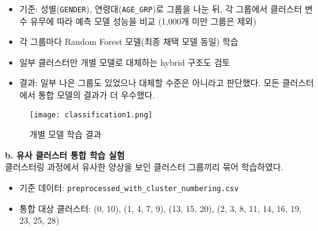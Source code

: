 \documentclass[sigconf]{acmart}
\begin{document}
\begin{CJK}{UTF8}{mj}
\begin{itemize}
  \item 기준: 성별(\texttt{GENDER}), 연령대(\texttt{AGE\_GRP})로 그룹을 나눈 뒤, 각 그룹에서 클러스터 변수 유무에 따라 예측 모델 성능을 비교 (1,000개 미만 그룹은 제외)
  \item 각 그룹마다 Random Forest 모델(최종 채택 모델 동일) 학습
  \item 일부 클러스터만 개별 모델로 대체하는 hybrid 구조도 검토
  \item 결과: 일부 나은 그룹도 있었으나 대체할 수준은 아니라고 판단했다. 모든 클러스터에서 통합 모델의 결과가 더 우수했다.
\end{itemize}
      \begin{figure}[H]
      \centering
      \texttt{[image: classification1.png]}
      \caption{개별 모델 학습 결과}
      \label{fig:based_on_cluster}
      \end{figure}

\vspace{0.5em}
\noindent\textbf{b. 유사 클러스터 통합 학습 실험}\mbox{}\\
클러스터링 과정에서 유사한 양상을 보인 클러스터 그룹끼리 묶어 학습하였다.

\begin{itemize}
  \item 기준 데이터: \texttt{preprocessed\_with\_cluster\_numbering.csv}
  \item 통합 대상 클러스터: (0, 10), (1, 4, 7, 9), (13, 15, 20), (2, 3, 8, 11, 14, 16, 19, 23, 25, 28)


\end{itemize}
\end{CJK}
\end{document}
